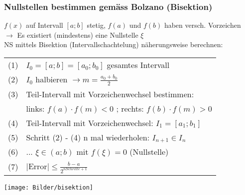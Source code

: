 \subsubsection{Nullstellen bestimmen gemäss Bolzano (Bisektion)}
    $f(x)$ auf Intervall $[a;b]$ stetig, $f(a)$ und $f(b)$ haben versch. Vorzeichen \\
    $\rightarrow$ Es existiert (mindestens) eine 	Nullstelle $\xi$\\	
    NS mittels Bisektion (Intervallschachtelung) näherungsweise berechnen: \\
    
    \begin{tabular}{ll}
        (1) & $I_0 = [a ; b] = [a_0 ; b_0]$ gesamtes Intervall \\
        (2) & $I_0$ halbieren $\rightarrow m = \frac{a_0 + b_0}{2}$ \\
        (3) & Teil-Intervall mit Vorzeichenwechsel bestimmen: \\
            & links: $f(a) \cdot f(m) < 0$ ; rechts: $f(b) \cdot f(m) > 0$ \\
        (4) & Teil-Intervall mit Vorzeichenwechsel: $I_1 = [a_1 ; b_1]$ \\
        (5) & Schritt (2) - (4) n mal wiederholen: $I_{n+1} \in I_n$ \\
        (6) & ... $\xi \in (a;b)$ mit $f(\xi) = 0$ (Nullstelle) \\
        (7) & $ \vert $Error$ \vert \leq \frac{b-a}{2^{n Schritte + 1}} $ \\
    \end{tabular}						
        
    \texttt{[image: Bilder/bisektion]}

